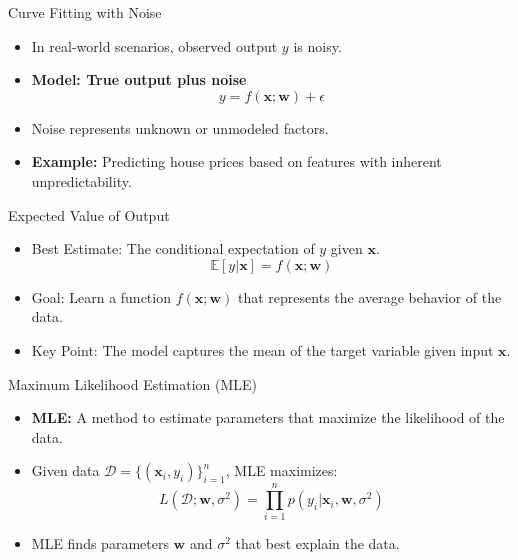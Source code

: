 \documentclass[serif, aspectratio=169]{beamer}
\begin{document}
    \begin{frame}{Curve Fitting with Noise}
        \begin{itemize}
            \item In real-world scenarios, observed output \( y \) is noisy.
            \item \textbf{Model: True output plus noise}
            \[
                y = f(\mathbf{x}; \mathbf{w}) + \epsilon
            \]
            \item Noise represents unknown or unmodeled factors.
            \item \textbf{Example:} Predicting house prices based on features with inherent unpredictability.
        \end{itemize}
    \end{frame}

    \begin{frame}{Expected Value of Output}
        \begin{itemize}
            \item Best Estimate: The conditional expectation of \( y \) given \( \mathbf{x} \).
            \[
                \mathbb{E}[y | \mathbf{x}] = f(\mathbf{x}; \mathbf{w})
            \]
            \item Goal: Learn a function \( f(\mathbf{x}; \mathbf{w}) \) that represents the average behavior of the data.
            \item Key Point: The model captures the mean of the target variable given input \( \mathbf{x} \).
        \end{itemize}
    \end{frame}

    \begin{frame}{Maximum Likelihood Estimation (MLE)}
        \begin{itemize}
            \item \textbf{MLE:} A method to estimate parameters that maximize the likelihood of the data.
            \item Given data \( \mathcal{D} = \{ (\mathbf{x}_i, y_i) \}_{i=1}^n \), MLE maximizes:
            \[
                L(\mathcal{D}; \mathbf{w}, \sigma^2) = \prod_{i=1}^n p(y_i | \mathbf{x}_i, \mathbf{w}, \sigma^2)
            \]
            \item MLE finds parameters \( \mathbf{w} \) and \( \sigma^2 \) that best explain the data.
        \end{itemize}
    \end{frame}
\end{document}
